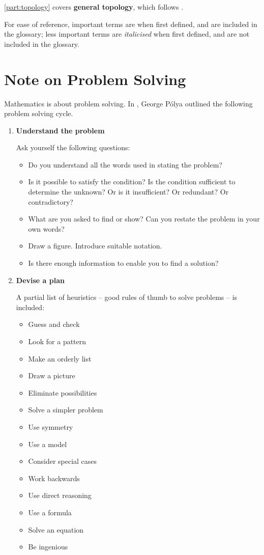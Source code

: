 \iftop
\cref{part:topology} covers \textbf{general topology}, which follows \cite{munkres}.
\fi

For ease of reference, important terms are  when first defined, and are included in the glossary; less important terms are \emph{italicised} when first defined, and are not included in the glossary.
\pagebreak

\section*{Note on Problem Solving}
Mathematics is about problem solving. In \cite{polya}, George P\'{o}lya outlined the following problem solving cycle.
\begin{enumerate}
\item \textbf{Understand the problem}

Ask yourself the following questions:
\begin{itemize}
\item Do you understand all the words used in stating the problem?
\item Is it possible to satisfy the condition? Is the condition sufficient to determine the unknown? Or is it insufficient? Or redundant? Or contradictory?
\item What are you asked to find or show? Can you restate the problem in your own words?
\item Draw a figure. Introduce suitable notation.
\item Is there enough information to enable you to find a solution?
\end{itemize}

\item \textbf{Devise a plan}

A partial list of heuristics -- good rules of thumb to solve problems -- is included:
\begin{multicols}{2}
\begin{itemize}
\item Guess and check
\item Look for a pattern
\item Make an orderly list
\item Draw a picture
\item Eliminate possibilities
\item Solve a simpler problem
\item Use symmetry
\item Use a model
\item Consider special cases
\item Work backwards
\item Use direct reasoning
\item Use a formula
\item Solve an equation
\item Be ingenious
\end{itemize}
\end{multicols}


\end{enumerate}
